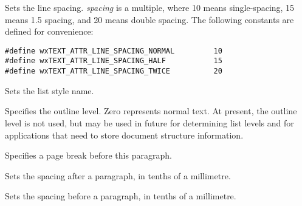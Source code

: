 
Sets the line spacing. {\it spacing} is a multiple, where 10 means single-spacing,
15 means 1.5 spacing, and 20 means double spacing. The following constants are
defined for convenience:

{\small
\begin{verbatim}
#define wxTEXT_ATTR_LINE_SPACING_NORMAL         10
#define wxTEXT_ATTR_LINE_SPACING_HALF           15
#define wxTEXT_ATTR_LINE_SPACING_TWICE          20
\end{verbatim}
}

\label{wxtextattrsetliststylename}


Sets the list style name.

\label{wxtextattrsetoutlinelevel}


Specifies the outline level. Zero represents normal text. At present, the outline level is
not used, but may be used in future for determining list levels and for applications
that need to store document structure information.

\label{wxtextattrsetpagebreak}


Specifies a page break before this paragraph.

\label{wxtextattrsetparagraphspacingafter}


Sets the spacing after a paragraph, in tenths of a millimetre.

\label{wxtextattrsetparagraphspacingbefore}


Sets the spacing before a paragraph, in tenths of a millimetre.

\label{wxtextattrsetparagraphstylename}


